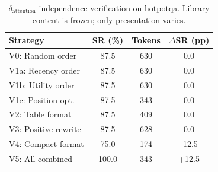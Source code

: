 \begin{table}[t]
\centering
\caption{$\delta_{\text{attention}}$ independence verification on hotpotqa. Library content is frozen; only presentation varies.}
\label{tab:delta_att}
\begin{tabular}{lccc}
\toprule
Strategy & SR (\%) & Tokens & $\Delta$SR (pp) \\
\midrule
V0: Random order & 87.5 & 630 & 0.0 \\
V1a: Recency order & 87.5 & 630 & 0.0 \\
V1b: Utility order & 87.5 & 630 & 0.0 \\
V1c: Position opt. & 87.5 & 343 & 0.0 \\
V2: Table format & 87.5 & 409 & 0.0 \\
V3: Positive rewrite & 87.5 & 628 & 0.0 \\
V4: Compact format & 75.0 & 174 & -12.5 \\
V5: All combined & 100.0 & 343 & +12.5 \\
\bottomrule
\end{tabular}
\end{table}